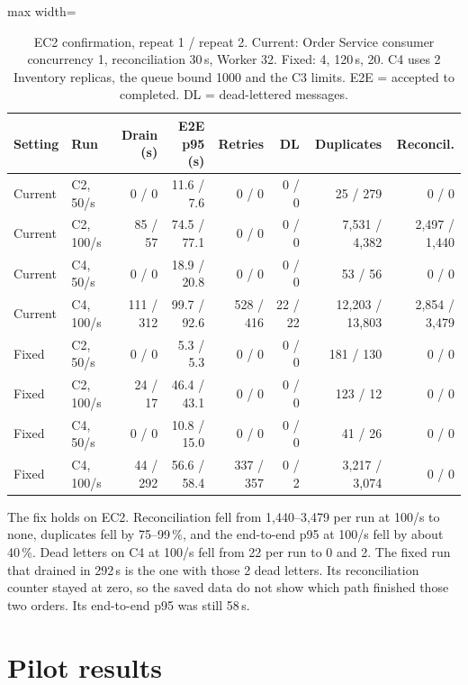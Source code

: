 \documentclass[a4paper]{report}
\begin{document}
\begin{table}[tbp]
\centering
\scriptsize
\caption{EC2 confirmation, repeat 1 / repeat 2. Current: Order Service consumer
concurrency 1, reconciliation 30\,s, Worker 32. Fixed: 4, 120\,s, 20. C4 uses 2
Inventory replicas, the queue bound 1000 and the C3 limits. E2E = accepted to
completed. DL = dead-lettered messages.}
\label{tab:confirmation}
\begin{adjustbox}{max width=\linewidth}
\begin{tabular}{@{}llrrrrrr@{}}
\toprule
Setting & Run & Drain (s) & E2E p95 (s) & Retries & DL & Duplicates & Reconcil. \\
\midrule
Current & C2, 50/s & 0 / 0 & 11.6 / 7.6 & 0 / 0 & 0 / 0 & 25 / 279 & 0 / 0 \\
Current & C2, 100/s & 85 / 57 & 74.5 / 77.1 & 0 / 0 & 0 / 0 & 7,531 / 4,382 & 2,497 / 1,440 \\
Current & C4, 50/s & 0 / 0 & 18.9 / 20.8 & 0 / 0 & 0 / 0 & 53 / 56 & 0 / 0 \\
Current & C4, 100/s & 111 / 312 & 99.7 / 92.6 & 528 / 416 & 22 / 22 & 12,203 / 13,803 & 2,854 / 3,479 \\
\midrule
Fixed & C2, 50/s & 0 / 0 & 5.3 / 5.3 & 0 / 0 & 0 / 0 & 181 / 130 & 0 / 0 \\
Fixed & C2, 100/s & 24 / 17 & 46.4 / 43.1 & 0 / 0 & 0 / 0 & 123 / 12 & 0 / 0 \\
Fixed & C4, 50/s & 0 / 0 & 10.8 / 15.0 & 0 / 0 & 0 / 0 & 41 / 26 & 0 / 0 \\
Fixed & C4, 100/s & 44 / 292 & 56.6 / 58.4 & 337 / 357 & 0 / 2 & 3,217 / 3,074 & 0 / 0 \\
\bottomrule
\end{tabular}
\end{adjustbox}
\end{table}

The fix holds on EC2. Reconciliation fell from 1,440--3,479 per run at 100/s to
none, duplicates fell by 75--99\,\%, and the end-to-end p95 at 100/s fell by
about 40\,\%. Dead letters on C4 at 100/s fell from 22 per run to 0 and 2. The
fixed run that drained in 292\,s is the one with those 2 dead letters. Its
reconciliation counter stayed at zero, so the saved data do not show which
path finished those two orders. Its end-to-end p95 was still 58\,s.


\section{Pilot results}
\label{sec:results-pilot}
\end{document}
